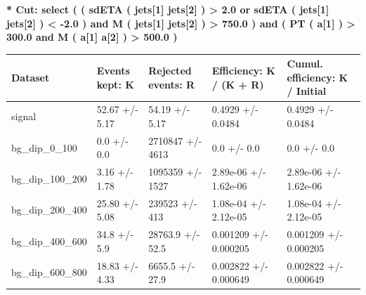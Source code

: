 \documentclass[a4paper, 10pt]{article}
\begin{document}
\textbf{* Cut: select ( ( sdETA ( jets[1] jets[2] ) > 2.0 or sdETA ( jets[1] jets[2] ) < -2.0 ) and M ( jets[1] jets[2] ) > 750.0 ) and ( PT ( a[1] ) > 300.0 and M ( a[1] a[2] ) > 500.0 )}\\
   \begin{table}[H]
  \begin{center}
    \begin{tabular}{|m{20.0mm}|m{27.0mm}|m{27.0mm}|m{33.0mm}|m{32.0mm}|}
      \hline
      {\cellcolor{yellow}         Dataset}& {\cellcolor{yellow}         Events kept:
          K}& {\cellcolor{yellow}         Rejected events:
          R}& {\cellcolor{yellow}         Efficiency:
          K /\- (K + R)}& {\cellcolor{yellow}         Cumul. efficiency:
          K /\- Initial}\\
      \hline
      {\cellcolor{white}         signal}& {\cellcolor{white}         52.67 +/\-- 5.17}& {\cellcolor{white}         54.19 +/\-- 5.17}& {\cellcolor{white}         0.4929 +/\-- 0.0484}& {\cellcolor{white}         0.4929 +/\-- 0.0484}\\
      \hline
      {\cellcolor{white}         bg\_dip\_0\_100}& {\cellcolor{white}         0.0 +/\-- 0.0}& {\cellcolor{white}         2710847 +/\-- 4613}& {\cellcolor{white}         0.0 +/\-- 0.0}& {\cellcolor{white}         0.0 +/\-- 0.0}\\
      \hline
      {\cellcolor{white}         bg\_dip\_100\_200}& {\cellcolor{white}         3.16 +/\-- 1.78}& {\cellcolor{white}         1095359 +/\-- 1527}& {\cellcolor{white}         2.89e-06 +/\-- 1.62e-06}& {\cellcolor{white}         2.89e-06 +/\-- 1.62e-06}\\
      \hline
      {\cellcolor{white}         bg\_dip\_200\_400}& {\cellcolor{white}         25.80 +/\-- 5.08}& {\cellcolor{white}         239523 +/\-- 413}& {\cellcolor{white}         1.08e-04 +/\-- 2.12e-05}& {\cellcolor{white}         1.08e-04 +/\-- 2.12e-05}\\
      \hline
      {\cellcolor{white}         bg\_dip\_400\_600}& {\cellcolor{white}         34.8 +/\-- 5.9}& {\cellcolor{white}         28763.9 +/\-- 52.5}& {\cellcolor{white}         0.001209 +/\-- 0.000205}& {\cellcolor{white}         0.001209 +/\-- 0.000205}\\
      \hline
      {\cellcolor{white}         bg\_dip\_600\_800}& {\cellcolor{white}         18.83 +/\-- 4.33}& {\cellcolor{white}         6655.5 +/\-- 27.9}& {\cellcolor{white}         0.002822 +/\-- 0.000649}& {\cellcolor{white}         0.002822 +/\-- 0.000649}\\

\end{tabular}
\end{center}
\end{table}
\end{document}
